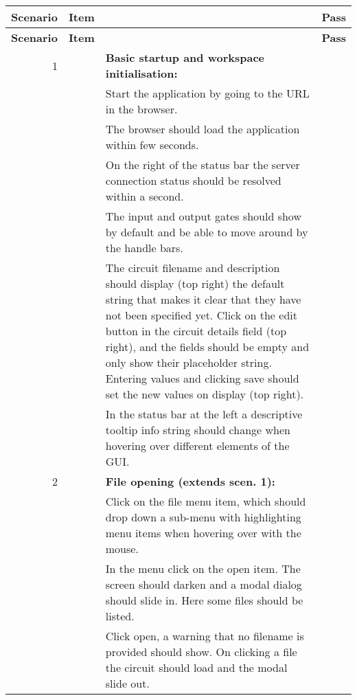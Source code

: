 \documentclass{article}
\newcounter{step}
\newcommand{\step}{\arabic{step}\stepcounter{step}}
\begin{document}
\begin{center}
\begin{longtable}{r r  p{} l } \toprule
\textbf{Scenario} & \textbf{Item} & & \textbf{Pass} \\\midrule
\endfirsthead
\toprule
\textbf{Scenario} & \textbf{Item} & & \textbf{Pass} \\\midrule
\endhead
1 && \textbf{Basic startup and workspace initialisation:}\\
&\step& Start the application by going to the URL in the browser.\\
&\step& The browser should load the application within few seconds.\\
&\step& On the right of the status bar the server connection status should be resolved within a second. \\
&\step& The input and output gates should show by default and be able to move around by the handle bars. \\
&\step& The circuit filename and description should display (top right) the default string that makes it clear that they have not been specified yet. Click on the edit button in the circuit details field (top right), and the fields should be empty and only show their placeholder string. Entering values and clicking save should set the new values on display (top right).\\
&\step& In the status bar at the left a descriptive tooltip info string should change when hovering over different elements of the GUI. & \\ \midrule

2 &\setcounter{step}{1}& \textbf{File opening (extends scen. 1):}\\
&\step& Click on the file menu item, which should drop down a sub-menu with highlighting menu items when hovering over with the mouse. \\
&\step& In the menu click on the open item. The screen should darken and a modal dialog should slide in. Here some files should be listed.\\
&\step& Click open, a warning that no filename is provided should show. On clicking a file the circuit should load and the modal slide out.\\\midrule


\end{longtable}
\end{center}
\end{document}
